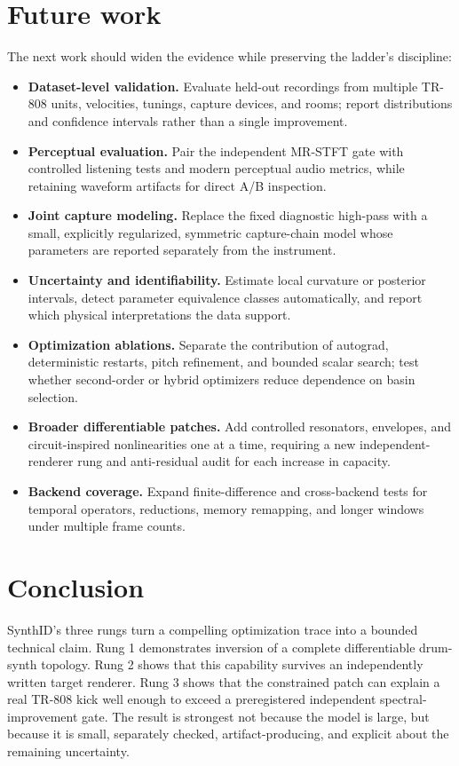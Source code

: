 \documentclass[10pt]{article}
\begin{document}
\section{Future work}

The next work should widen the evidence while preserving the ladder's discipline:

\begin{itemize}
  \item \textbf{Dataset-level validation.} Evaluate held-out recordings from multiple TR-808 units, velocities, tunings, capture devices, and rooms; report distributions and confidence intervals rather than a single improvement.
  \item \textbf{Perceptual evaluation.} Pair the independent MR-STFT gate with controlled listening tests and modern perceptual audio metrics, while retaining waveform artifacts for direct A/B inspection.
  \item \textbf{Joint capture modeling.} Replace the fixed diagnostic high-pass with a small, explicitly regularized, symmetric capture-chain model whose parameters are reported separately from the instrument.
  \item \textbf{Uncertainty and identifiability.} Estimate local curvature or posterior intervals, detect parameter equivalence classes automatically, and report which physical interpretations the data support.
  \item \textbf{Optimization ablations.} Separate the contribution of autograd, deterministic restarts, pitch refinement, and bounded scalar search; test whether second-order or hybrid optimizers reduce dependence on basin selection.
  \item \textbf{Broader differentiable patches.} Add controlled resonators, envelopes, and circuit-inspired nonlinearities one at a time, requiring a new independent-renderer rung and anti-residual audit for each increase in capacity.
  \item \textbf{Backend coverage.} Expand finite-difference and cross-backend tests for temporal operators, reductions, memory remapping, and longer windows under multiple frame counts.
\end{itemize}

\section{Conclusion}

SynthID's three rungs turn a compelling optimization trace into a bounded technical claim. Rung 1 demonstrates inversion of a complete differentiable drum-synth topology. Rung 2 shows that this capability survives an independently written target renderer. Rung 3 shows that the constrained patch can explain a real TR-808 kick well enough to exceed a preregistered independent spectral-improvement gate. The result is strongest not because the model is large, but because it is small, separately checked, artifact-producing, and explicit about the remaining uncertainty.
\end{document}

